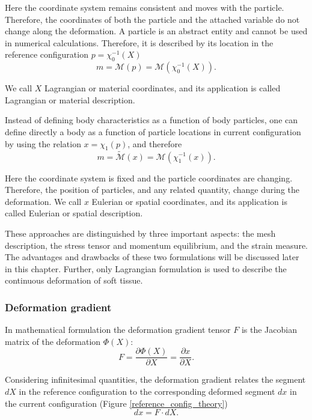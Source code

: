 Here the coordinate system remains consistent and moves with the particle. Therefore, the coordinates of both the particle and the attached variable do not change along the deformation. A particle is an abstract entity and cannot be used in numerical calculations. Therefore, it is described by its location in the reference configuration $p= \chi_0^{-1}(X)$ 
\begin{equation}
 m =  \mathcal{M}(p) = \mathcal{M}(\chi_0^{-1}(X)).
\end{equation}

 We call $X$ Lagrangian or material coordinates, and its application is called Lagrangian or material description.  
 

Instead of defining body characteristics as a function of body particles, one can define directly a body as a function of particle locations in current configuration by using the relation $ x = \chi_1(p)$, and therefore 
\begin{equation}
m = \tilde{ \mathcal{M}}(x) = \mathcal{M}(\chi_1^{-1}(x)).
\end{equation}

 Here the coordinate system is fixed and the particle coordinates are changing. Therefore, the position of particles, and any related quantity, change during the deformation. We call $x$ Eulerian or spatial coordinates, and its application is called Eulerian or spatial description.
 
 These approaches are distinguished by three important aspects: the mesh description, the stress tensor and momentum equilibrium, and the strain measure. The advantages and drawbacks of these two formulations will be discussed later in this chapter. Further, only Lagrangian formulation is used to describe the continuous deformation of soft tissue.       

\subsubsection*{Deformation gradient}\label{deformatiogradient}

In mathematical formulation the deformation gradient tensor $F$ is the Jacobian matrix of the deformation $\Phi(X)$:
\begin{equation}
F = \frac{\partial \Phi (X)}{\partial X} = \frac{\partial x}{\partial X}.
\end{equation}

Considering infinitesimal quantities, the deformation gradient relates the segment $dX$ in the reference configuration to the corresponding deformed segment $dx$ in the current configuration (Figure \ref{reference_config_theory}) 
\begin{equation}
dx = F \cdot dX.
\label{deformationGradRelation}
\end{equation}

